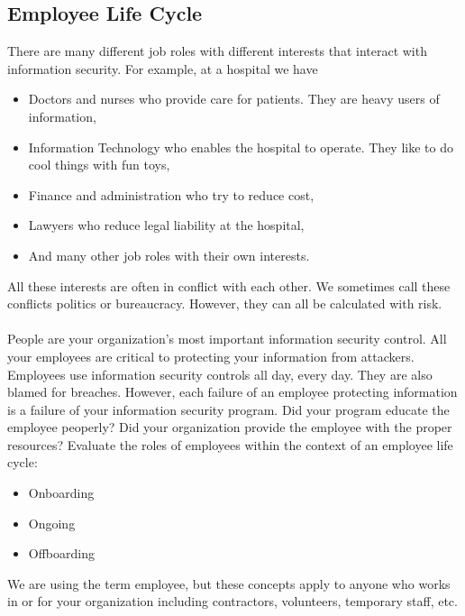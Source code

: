 \subsection{Employee Life Cycle}\label{subsec:"Employee Life Cycle"}
There are many different job roles with different interests that interact with information security. For example, at a hospital we have
\begin{itemize}
\item Doctors and nurses who provide care for patients. They are heavy users of information,
\item Information Technology who enables the hospital to operate. They like to do cool things with fun toys,
\item Finance and administration who try to reduce cost,
\item Lawyers who reduce legal liability at the hospital,
\item And many other job roles with their own interests.
\end{itemize}
All these interests are often in conflict with each other. We sometimes call these conflicts politics or bureaucracy. However, they can all be calculated with risk.\\\\
People are your organization's most important information security control. All your employees are critical to protecting your information from attackers. Employees use information security controls all day, every day. They are also blamed for breaches. However, each failure of an employee protecting information is a failure of your information security program. Did your program educate the employee peoperly? Did your organization provide the employee with the proper resources? Evaluate the roles of employees within the context of an employee life cycle: 
\begin{itemize}
\item Onboarding
\item Ongoing
\item Offboarding
\end{itemize} We are using the term employee, but these concepts apply to anyone who works in or for your organization including contractors, volunteers, temporary staff, etc.

